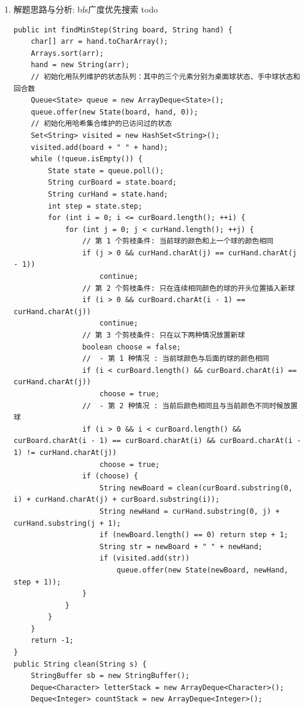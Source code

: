 \documentclass[9pt, b5paaper]{book}
\begin{document}
\begin{enumerate}
\item 解题思路与分析: bfs广度优先搜索 todo
\label{sec-1-0-9-1}
\begin{verbatim}
public int findMinStep(String board, String hand) {
    char[] arr = hand.toCharArray();
    Arrays.sort(arr);
    hand = new String(arr);
    // 初始化用队列维护的状态队列：其中的三个元素分别为桌面球状态、手中球状态和回合数
    Queue<State> queue = new ArrayDeque<State>();
    queue.offer(new State(board, hand, 0));
    // 初始化用哈希集合维护的已访问过的状态
    Set<String> visited = new HashSet<String>();
    visited.add(board + " " + hand);
    while (!queue.isEmpty()) {
        State state = queue.poll();
        String curBoard = state.board;
        String curHand = state.hand;
        int step = state.step;
        for (int i = 0; i <= curBoard.length(); ++i) {
            for (int j = 0; j < curHand.length(); ++j) {
                // 第 1 个剪枝条件: 当前球的颜色和上一个球的颜色相同
                if (j > 0 && curHand.charAt(j) == curHand.charAt(j - 1)) 
                    continue;
                // 第 2 个剪枝条件: 只在连续相同颜色的球的开头位置插入新球
                if (i > 0 && curBoard.charAt(i - 1) == curHand.charAt(j)) 
                    continue;
                // 第 3 个剪枝条件: 只在以下两种情况放置新球
                boolean choose = false;
                //  - 第 1 种情况 : 当前球颜色与后面的球的颜色相同
                if (i < curBoard.length() && curBoard.charAt(i) == curHand.charAt(j)) 
                    choose = true;
                //  - 第 2 种情况 : 当前后颜色相同且与当前颜色不同时候放置球
                if (i > 0 && i < curBoard.length() && curBoard.charAt(i - 1) == curBoard.charAt(i) && curBoard.charAt(i - 1) != curHand.charAt(j))
                    choose = true;
                if (choose) {
                    String newBoard = clean(curBoard.substring(0, i) + curHand.charAt(j) + curBoard.substring(i));
                    String newHand = curHand.substring(0, j) + curHand.substring(j + 1);
                    if (newBoard.length() == 0) return step + 1;
                    String str = newBoard + " " + newHand;
                    if (visited.add(str)) 
                        queue.offer(new State(newBoard, newHand, step + 1));
                }
            }
        }
    }
    return -1;
}
public String clean(String s) {
    StringBuffer sb = new StringBuffer();
    Deque<Character> letterStack = new ArrayDeque<Character>();
    Deque<Integer> countStack = new ArrayDeque<Integer>();

\end{verbatim}
\end{enumerate}
\end{document}
